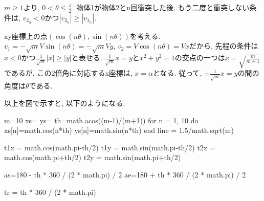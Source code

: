 \documentclass[lualatex,a5paper,ja=standard]{bxjsarticle}
\begin{document}
$m \ge 1$より, $0 < \theta \le \frac{\pi}{2}$. 物体1が物体2とn回衝突した後, もう二度と衝突しない条件は, $v_{2_n} < 0$かつ$|v_{2_n}| \ge |v_{1_n}|$.

xy座標上の点$(\cos(n\theta), \sin(n\theta))$を考える. $v_1 = -\sqrt{m}V\sin(n\theta) = -\sqrt{m}Vy$, $v_2 = V\cos(n\theta) = Vx$だから, 先程の条件は$x<0$かつ$\frac{1}{\sqrt{m}} |x| \ge |y|$と表せる.
$\frac{1}{\sqrt{m}} x = y$と$x^2 + y^2 = 1$の交点の一つは$x=\sqrt{\frac{m}{m+1}}$であるが, この2倍角に対応するx座標は, $x=\alpha$となる. 従って, $\pm\frac{1}{\sqrt{m}} x = y$の間の角度は$\theta$である.

以上を図で示すと, 以下のようになる.

\begin{luacode*}
    m=10
    xs={}
    ys={}
    th=math.acos((m-1)/(m+1))
    for n = 1, 10 do
        xs[n]=math.cos(n*th)
        ys[n]=math.sin(n*th)
    end
    line = 1.5/math.sqrt(m)

    t1x = math.cos(math.pi-th/2)
    t1y = math.sin(math.pi-th/2)
    t2x = math.cos(math.pi+th/2)
    t2y = math.sin(math.pi+th/2)

    as=180 - th * 360 / (2 * math.pi) / 2
    ae=180 + th * 360 / (2 * math.pi) / 2

    tr = th * 360 / (2 * math.pi)
\end{luacode*}
\end{document}
